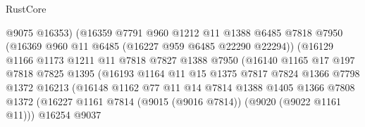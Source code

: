 \begin{lexlean}{RustCore}
\begin{coremodule}
                                  @9075
                                  @16353)
                                (@16359
                                  @7791
                                  @960
                                  @1212
                                  @11
                                  @1388
                                  @6485
                                  @7818
                                  @7950
                                  (@16369 @960 @11 @6485 (@16227 @959 @6485 @22290 @22294))
                                  (@16129
                                    @1166
                                    @1173
                                    @1211
                                    @11
                                    @7818
                                    @7827
                                    @1388
                                    @7950
                                    (@16140
                                      @1165
                                      @17
                                      @197
                                      @7818
                                      @7825
                                      @1395
                                      (@16193
                                        @1164
                                        @11
                                        @15
                                        @1375
                                        @7817
                                        @7824
                                        @1366
                                        @7798
                                        @1372
                                        @16213
                                        (@16148
                                          @1162
                                          @77
                                          @11
                                          @14
                                          @7814
                                          @1388
                                          @1405
                                          @1366
                                          @7808
                                          @1372
                                          (@16227
                                            @1161
                                            @7814
                                            (@9015 (@9016 @7814))
                                            (@9020 (@9022 @1161 @11)))
                                          @16254
                                          @9037

\end{coremodule}
\end{lexlean}

